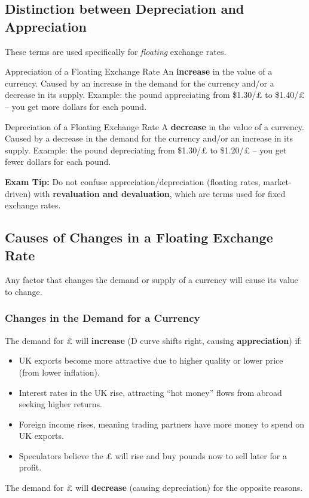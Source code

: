 \documentclass[11pt, a4paper, twoside]{book}
\begin{document}
\subsection{Distinction between Depreciation and Appreciation}

These terms are used specifically for \emph{floating} exchange rates.

\begin{keyterm}{Appreciation of a Floating Exchange Rate}
An \textbf{increase} in the value of a currency. Caused by an increase in the demand for the currency and/or a decrease in its supply. Example: the pound appreciating from \$1.30/£ to \$1.40/£ -- you get more dollars for each pound.
\end{keyterm}

\begin{keyterm}{Depreciation of a Floating Exchange Rate}
A \textbf{decrease} in the value of a currency. Caused by a decrease in the demand for the currency and/or an increase in its supply. Example: the pound depreciating from \$1.30/£ to \$1.20/£ -- you get fewer dollars for each pound.
\end{keyterm}

\begin{coreidea}
\textbf{Exam Tip:} Do not confuse appreciation/depreciation (floating rates, market-driven) with \textbf{revaluation and devaluation}, which are terms used for fixed exchange rates.
\end{coreidea}

\subsection{Causes of Changes in a Floating Exchange Rate}

Any factor that changes the demand or supply of a currency will cause its value to change.

\subsubsection{Changes in the Demand for a Currency}

The demand for £ will \textbf{increase} (D curve shifts right, causing \textbf{appreciation}) if:
\begin{itemize}
  \item UK exports become more attractive due to higher quality or lower price (from lower inflation).
  \item Interest rates in the UK rise, attracting ``hot money'' flows from abroad seeking higher returns.
  \item Foreign income rises, meaning trading partners have more money to spend on UK exports.
  \item Speculators believe the £ will rise and buy pounds now to sell later for a profit.
\end{itemize}
The demand for £ will \textbf{decrease} (causing depreciation) for the opposite reasons.
\end{document}

